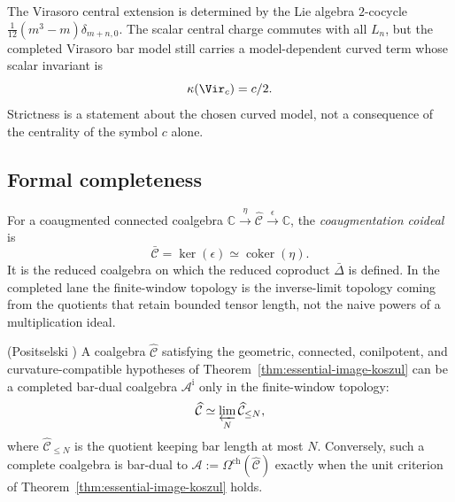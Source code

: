 \begin{example}\label{ex:virasoro-central-charge-curvature}
The Virasoro central extension is determined by the Lie algebra
$2$-cocycle $\frac{1}{12}(m^3-m)\delta_{m+n,0}$. The scalar central
charge commutes with all $L_n$, but the completed Virasoro bar model
still carries a model-dependent curved term whose scalar invariant is
\[
\kappa(\Vir_c)=c/2.
\]
Strictness is a statement about the chosen curved model, not a
consequence of the centrality of the symbol $c$ alone.
\end{example}

\subsection{Formal completeness}

\begin{definition}\label{def:coaugmentation-coideal}
For a coaugmented connected coalgebra
$\mathbb{C}\xrightarrow{\eta}\widehat{\mathcal{C}}
\xrightarrow{\epsilon}\mathbb{C}$, the \emph{coaugmentation coideal}
is
\[
\bar{\mathcal{C}}=\ker(\epsilon)\simeq
\operatorname{coker}(\eta).
\]
It is the reduced coalgebra on which the reduced coproduct
$\bar\Delta$ is defined. In the completed lane the finite-window
topology is the inverse-limit topology coming from the quotients that
retain bounded tensor length, not the naive powers of a multiplication
ideal.
\end{definition}

\begin{theorem}\label{thm:completion-characterization}
\textup{(Positselski \cite{Positselski11})}
A coalgebra $\widehat{\mathcal{C}}$ satisfying the geometric,
connected, conilpotent, and curvature-compatible hypotheses of
Theorem~\ref{thm:essential-image-koszul} can be a completed
bar-dual coalgebra $\mathcal{A}^{\mathrm i}$ only in the
finite-window topology:
\[
\widehat{\mathcal{C}}
\simeq
\varprojlim_N \widehat{\mathcal{C}}_{\leq N},
\]
where $\widehat{\mathcal{C}}_{\leq N}$ is the quotient keeping bar
length at most $N$. Conversely, such a complete coalgebra is
bar-dual to
$\mathcal{A}:=\Omega^{\mathrm{ch}}(\widehat{\mathcal{C}})$ exactly
when the unit criterion of Theorem~\ref{thm:essential-image-koszul}
holds.
\end{theorem}

